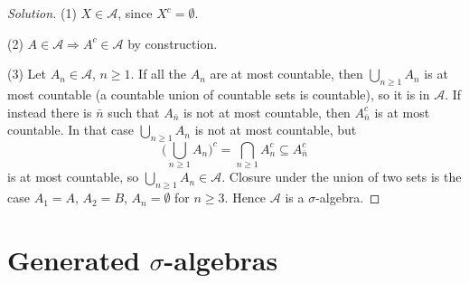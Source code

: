 \begin{proof}[Solution]
(1) $X\in\mathcal A$, since $X^c=\emptyset$.

(2) $A\in\mathcal A\Rightarrow A^c\in\mathcal A$ by construction.

(3) Let $A_n\in\mathcal A$, $n\ge1$. If all the $A_n$ are at most countable, then
$\bigcup_{n\ge1}A_n$ is at most countable (a countable union of countable sets is countable), so it
is in $\mathcal A$. If instead there is $\bar n$ such that $A_{\bar n}$ is not at most countable,
then $A_{\bar n}^c$ is at most countable. In that case $\bigcup_{n\ge1}A_n$ is not at most
countable, but
\[
  \Big(\bigcup_{n\ge1}A_n\Big)^c=\bigcap_{n\ge1}A_n^c\subseteq A_{\bar n}^c
\]
is at most countable, so $\bigcup_{n\ge1}A_n\in\mathcal A$. Closure under the union of two sets is
the case $A_1=A$, $A_2=B$, $A_n=\emptyset$ for $n\ge3$. Hence $\mathcal A$ is a $\sigma$-algebra.
\end{proof}

\section{Generated \texorpdfstring{$\sigma$}{sigma}-algebras}\label{sec:sa-generated}

